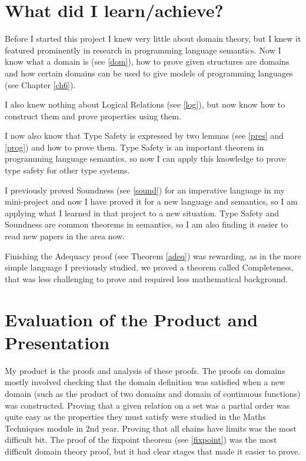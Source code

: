 \section{What did I learn/achieve?}
Before I started this project I knew very little about domain theory, but I knew it featured prominently in research in programming language semantics. Now I know what a domain is (see \ref{dom}), how to prove given structures are domains and how certain domains can be used to give models of programming languages (see Chapter \ref{ch6}).

I also knew nothing about Logical Relations (see \ref{log}), but now know how to construct them and prove properties using them.

I now also know that Type Safety is expressed by two lemmas (see \ref{pres} and \ref{prog}) and how to prove them. Type Safety is an important theorem in programming language semantics, so now I can apply this knowledge to prove type safety for other type systems.

I previously proved Soundness (see \ref{sound}) for an imperative language in my mini-project and now I have proved it for a new language and semantics, so I am applying what I learned in that project to a new situation. Type Safety and Soundness are common theorems in semantics, so I am also finding it easier to read new papers in the area now.

Finishing the Adequacy proof (see Theorem \ref{adeq}) was rewarding, as in the more simple language I previously studied, we proved a theorem called Completeness, that was less challenging to prove and required less mathematical background.
 
\section{Evaluation of the Product and Presentation}
My product is the proofs and analysis of these proofs. The proofs on domains mostly involved checking that the domain definition was satisfied when a new domain (such as the product of two domains and domain of continuous functions)  was constructed. Proving that a given relation on a set was a partial order was quite easy as the properties they must satisfy were studied in the Maths Techniques module in 2nd year. Proving that all chains have limits was the most difficult bit. The proof of the fixpoint theorem (see \ref{fixpoint}) was the most difficult domain theory proof, but it had clear stages that made it easier to prove.

